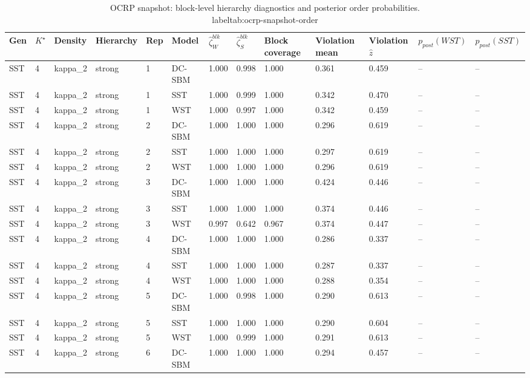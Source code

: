 \begin{table}[!h]
\centering
\caption{OCRP snapshot: block-level hierarchy diagnostics and posterior order probabilities.\\label{tab:ocrp-snapshot-order}}
\centering
\begin{tabular}[t]{lllllllllllll}
\toprule
Gen & $K^\star$ & Density & Hierarchy & Rep & Model & $\widehat\zeta_W^{blk}$ & $\widehat\zeta_S^{blk}$ & Block coverage & Violation mean & Violation $\hat z$ & $p_{post}(WST)$ & $p_{post}(SST)$\\
\midrule
SST & 4 & kappa_2 & strong & 1 & DC-SBM & 1.000 & 0.998 & 1.000 & 0.361 & 0.459 & -- & --\\
SST & 4 & kappa_2 & strong & 1 & SST & 1.000 & 0.999 & 1.000 & 0.342 & 0.470 & -- & --\\
SST & 4 & kappa_2 & strong & 1 & WST & 1.000 & 0.997 & 1.000 & 0.342 & 0.459 & -- & --\\
SST & 4 & kappa_2 & strong & 2 & DC-SBM & 1.000 & 1.000 & 1.000 & 0.296 & 0.619 & -- & --\\
SST & 4 & kappa_2 & strong & 2 & SST & 1.000 & 1.000 & 1.000 & 0.297 & 0.619 & -- & --\\
SST & 4 & kappa_2 & strong & 2 & WST & 1.000 & 1.000 & 1.000 & 0.296 & 0.619 & -- & --\\
SST & 4 & kappa_2 & strong & 3 & DC-SBM & 1.000 & 1.000 & 1.000 & 0.424 & 0.446 & -- & --\\
SST & 4 & kappa_2 & strong & 3 & SST & 1.000 & 1.000 & 1.000 & 0.374 & 0.446 & -- & --\\
SST & 4 & kappa_2 & strong & 3 & WST & 0.997 & 0.642 & 0.967 & 0.374 & 0.447 & -- & --\\
SST & 4 & kappa_2 & strong & 4 & DC-SBM & 1.000 & 1.000 & 1.000 & 0.286 & 0.337 & -- & --\\
SST & 4 & kappa_2 & strong & 4 & SST & 1.000 & 1.000 & 1.000 & 0.287 & 0.337 & -- & --\\
SST & 4 & kappa_2 & strong & 4 & WST & 1.000 & 1.000 & 1.000 & 0.288 & 0.354 & -- & --\\
SST & 4 & kappa_2 & strong & 5 & DC-SBM & 1.000 & 0.998 & 1.000 & 0.290 & 0.613 & -- & --\\
SST & 4 & kappa_2 & strong & 5 & SST & 1.000 & 1.000 & 1.000 & 0.290 & 0.604 & -- & --\\
SST & 4 & kappa_2 & strong & 5 & WST & 1.000 & 0.999 & 1.000 & 0.291 & 0.613 & -- & --\\
SST & 4 & kappa_2 & strong & 6 & DC-SBM & 1.000 & 1.000 & 1.000 & 0.294 & 0.457 & -- & --\\

\end{tabular}
\end{table}
